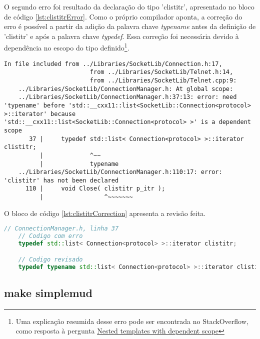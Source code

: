 O segundo erro foi resultado da declaração do tipo 'clistitr', apresentado no bloco de código \ref{lst:clistitrError}. 
Como o próprio compilador aponta, a correção do erro é possível a partir da adição da 
palavra chave \textit{typename} antes da definição de 'clistitr' e após a palavra chave \textit{typedef}. 
Essa correção foi necessária devido à dependência no escopo do tipo definido\footnote{
    Uma explicação resumida desse erro pode ser encontrada no StackOverflow, 
    como resposta à pergunta \href{https://stackoverflow.com/questions/3311633/nested-templates-with-dependent-scope/3311640\#3311640}{Nested templates with dependent scope}
}.

\begin{lstlisting}[breaklines, label={lst:clistitrError}, caption={Exemplo de erro levantado pela declaração de 'clistitr'}]
    In file included from ../Libraries/SocketLib/Connection.h:17,
                        from ../Libraries/SocketLib/Telnet.h:14,
                        from ../Libraries/SocketLib/Telnet.cpp:9:
    ../Libraries/SocketLib/ConnectionManager.h: At global scope:
    ../Libraries/SocketLib/ConnectionManager.h:37:13: error: need 'typename' before 'std::__cxx11::list<SocketLib::Connection<protocol> >::iterator' because 'std::__cxx11::list<SocketLib::Connection<protocol> >' is a dependent scope
       37 |     typedef std::list< Connection<protocol> >::iterator clistitr;
          |             ^~~
          |             typename 
    ../Libraries/SocketLib/ConnectionManager.h:110:17: error: 'clistitr' has not been declared
      110 |     void Close( clistitr p_itr );
          |                 ^~~~~~~~
\end{lstlisting}

O bloco de código \ref{lst:clistitrCorrection} apresenta a revisão feita.

\begin{lstlisting}[breaklines, label={lst:clistitrCorrection}, caption={Revisão da declaração de 'clistitr'}, language=C++]
    // ConnectionManager.h, linha 37
    // Codigo com erro
    typedef std::list< Connection<protocol> >::iterator clistitr;

    // Codigo revisado
    typedef typename std::list< Connection<protocol> >::iterator clistitr;
\end{lstlisting}

\subsection{make simplemud}

